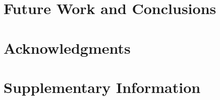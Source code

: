 \documentclass[fleqn,10pt,onecolumn]{ipcc} %
\begin{document}
\section{Future Work and Conclusions}

\section*{Acknowledgments} %


\newpage
{}



\section*{Supplementary Information} %

\end{document}
